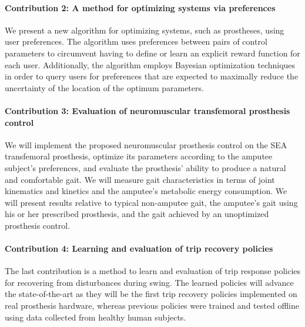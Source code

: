 \paragraph{Contribution 2: A method for optimizing systems via preferences} We
present a new algorithm for optimizing systems, such as prostheses, using user
preferences.  The algorithm uses preferences between pairs of control parameters
to circumvent having to define or learn an explicit reward function for each
user. Additionally, the algorithm employs Bayesian optimization techniques in
order to query users for preferences that are expected to maximally reduce the
uncertainty of the location of the optimum parameters.

\paragraph{Contribution 3: Evaluation of neuromuscular transfemoral prosthesis
control} We will implement the proposed neuromuscular prosthesis control on the
SEA transfemoral prosthesis, optimize its parameters according to the amputee
subject's preferences, and evaluate the prosthesis' ability to produce a natural
and comfortable gait. We will measure gait characteristics in terms of joint
kinematics and kinetics and the amputee's metabolic energy consumption. We will
present results relative to typical non-amputee gait, the amputee's gait using
his or her prescribed prosthesis, and the gait achieved by an unoptimized
prosthesis control.

\paragraph{Contribution 4: Learning and evaluation of trip recovery policies}
The last contribution is a method to learn and evaluation of trip response
policies for recovering from disturbances during swing. The learned policies
will advance the state-of-the-art as they will be the first trip recovery
policies implemented on real prosthesis hardware, whereas previous policies were
trained and tested offline using data collected from healthy human subjects.
